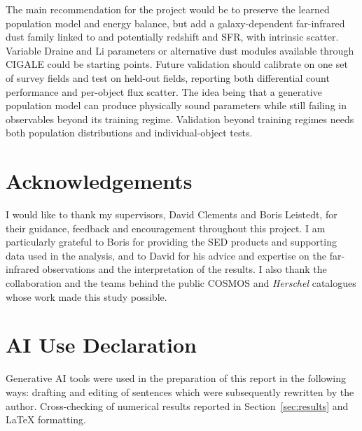 \documentclass[12pt,a4paper]{article}
\begin{document}
The main recommendation for the \popcosmos{} project would be to preserve the learned
population model and energy balance, but add a galaxy-dependent far-infrared dust
family linked to \LIR{} and potentially redshift and SFR, with intrinsic scatter.
Variable Draine and Li parameters \citep{Draine_2007} or alternative dust modules
available through CIGALE could be starting points. Future validation should calibrate
on one set of survey fields and test on held-out fields, reporting both differential
count performance and per-object flux scatter. The idea being that a generative
population model can produce physically sound parameters while still failing in
observables beyond its training regime. Validation beyond training regimes needs
both population distributions and individual-object tests.

\section*{Acknowledgements}
I would like to thank my supervisors, David Clements and Boris Leistedt, for their
guidance, feedback and encouragement throughout this project. I am particularly
grateful to Boris for providing the \popcosmos{} SED products and supporting data used
in the analysis, and to David for his advice and expertise on the far-infrared observations and the
interpretation of the results. I also thank the \popcosmos{} collaboration and the
teams behind the public COSMOS and \emph{Herschel} catalogues whose work made this
study possible.

\FloatBarrier
\section*{AI Use Declaration}
Generative AI tools were used in the preparation of this report in the following
ways: drafting and editing of sentences which were subsequently rewritten by
the author. Cross-checking of numerical results reported in
Section~\ref{sec:results} and LaTeX formatting. 



\end{document}
